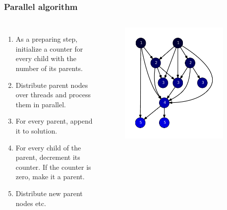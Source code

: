 \begin{frame}
\frametitle{Parallel algorithm}
\begin{columns}[T]
  \begin{enumerate}
    \item As a preparing step, initialize a counter for every child with the number of its parents.
    \item Distribute parent nodes over threads and process them in parallel.
    \item For every parent, append it to solution.
    \item For every child of the parent, decrement its counter. If the counter is zero, make it a parent.
    \item Distribute new parent nodes etc.
  \end{enumerate}

  \begin{figure}[!ht]
    \begin{center}
      \includegraphics[width=0.9\textwidth]{img/software10.pdf}
    \end{center}
  \end{figure}
\end{columns}

\end{frame}


